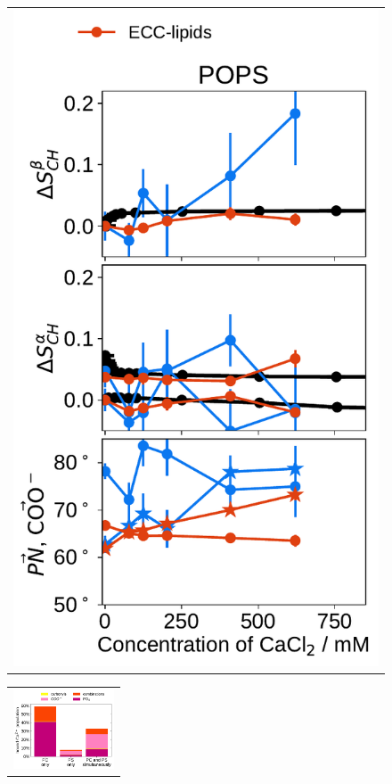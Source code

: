 \documentclass[journal=jpcbfk,manuscript=article]{achemso}
\newlength{\figheightsmall}
\newlength{\figheight}
\begin{document}
\begin{figure}[tbp!]
\begin{tabular}{ c }
  \includegraphics[height=\figheightsmall]{../img/ecc_pops/order_parameters_changes_ecc-lip_L14_A-B-PN-COO_POPS_cacl.pdf} 
  \end{tabular}
  \begin{tabular}{ c }
  \includegraphics[width=3cm]{../img/bound_ca_populations.pdf} \\

\end{tabular}
\end{figure}
\end{document}
